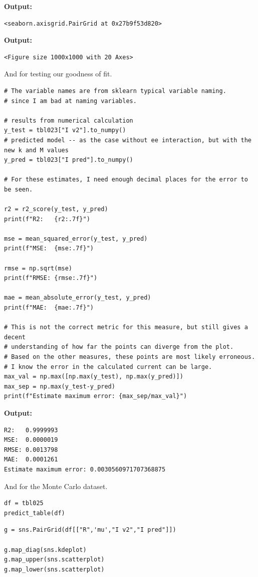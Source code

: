 \documentclass{article}
\begin{document}
\textbf{Output:}\begin{verbatim}
<seaborn.axisgrid.PairGrid at 0x27b9f53d820>
\end{verbatim}

\textbf{Output:}\begin{verbatim}
<Figure size 1000x1000 with 20 Axes>
\end{verbatim}

And for testing our goodness of fit.

\begin{lstlisting}
# The variable names are from sklearn typical variable naming.
# since I am bad at naming variables.

# results from numerical calculation
y_test = tbl023["I v2"].to_numpy()   
# predicted model -- as the case without ee interaction, but with the new k and M values
y_pred = tbl023["I pred"].to_numpy() 

# For these estimates, I need enough decimal places for the error to be seen.

r2 = r2_score(y_test, y_pred)
print(f"R2:   {r2:.7f}")

mse = mean_squared_error(y_test, y_pred)
print(f"MSE:  {mse:.7f}")

rmse = np.sqrt(mse)
print(f"RMSE: {rmse:.7f}")

mae = mean_absolute_error(y_test, y_pred)
print(f"MAE:  {mae:.7f}")

# This is not the correct metric for this measure, but still gives a decent
# understanding of how far the points can diverge from the plot. 
# Based on the other measures, these points are most likely erroneous.
# I know the error in the calculated current can be large.
max_val = np.max([np.max(y_test), np.max(y_pred)])
max_sep = np.max(y_test-y_pred)
print(f"Estimate maximum error: {max_sep/max_val}")\end{lstlisting}

\textbf{Output:}\begin{verbatim}
R2:   0.9999993
MSE:  0.0000019
RMSE: 0.0013798
MAE:  0.0001261
Estimate maximum error: 0.0030560971707368875

\end{verbatim}

And for the Monte Carlo dataset.

\begin{lstlisting}
df = tbl025
predict_table(df)\end{lstlisting}

\begin{lstlisting}
g = sns.PairGrid(df[["R",'mu',"I v2","I pred"]])

g.map_diag(sns.kdeplot)
g.map_upper(sns.scatterplot)
g.map_lower(sns.scatterplot)\end{lstlisting}
\end{document}
